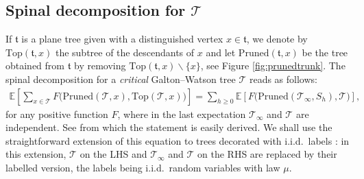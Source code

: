 \subsection{Spinal decomposition for $ \mathcal{T}$} If $ \mathfrak{t}$ is a plane tree given with a distinguished vertex $x \in \mathfrak{t}$, we denote by $ \mathrm{Top}( \mathfrak{t},x)$ the subtree of the descendants of $x$ and let $ \mathrm{Pruned}( \mathfrak{t},x)$ be the tree obtained from $ \mathfrak{t}$ by removing $ \mathrm{Top}( \mathfrak{t},x) \backslash \{x\}$, see Figure \ref{fig:prunedtrunk}. 
The spinal decomposition   for a \emph{critical} Galton--Watson tree $\mathcal{T}$  reads as follows: 
 \begin{eqnarray} \mathbb{E}\left[\sum_{x \in \mathcal{T}} F\Big(\mathrm{Pruned}(  \mathcal{T},x) , \mathrm{Top}( \mathcal{T},x) 	\Big)\right] 
  = \sum_{h \geq 0} \mathbb{E}\left[F\Big( \mathrm{Pruned}( \mathcal{T}_{\infty}, S_{h}) , \mathcal{T} 	\Big)\right], \label{eq:spinal}
 \end{eqnarray}
for any positive function $F$,  where in the last expectation $ \mathcal{T}_{\infty}$ and $ \mathcal{T}$ are independent. See \cite[Chapter 12.1]{LP16} 
%
from which the statement is easily derived. We shall use the straightforward extension of this equation to trees decorated with i.i.d.~labels : in this extension, $\mathcal{T}$ on the LHS and $\mathcal{T}_{\infty}$ and $\mathcal{T}$ on the RHS are replaced by their labelled version, the labels being i.i.d.~random variables with law $\mu$. 

